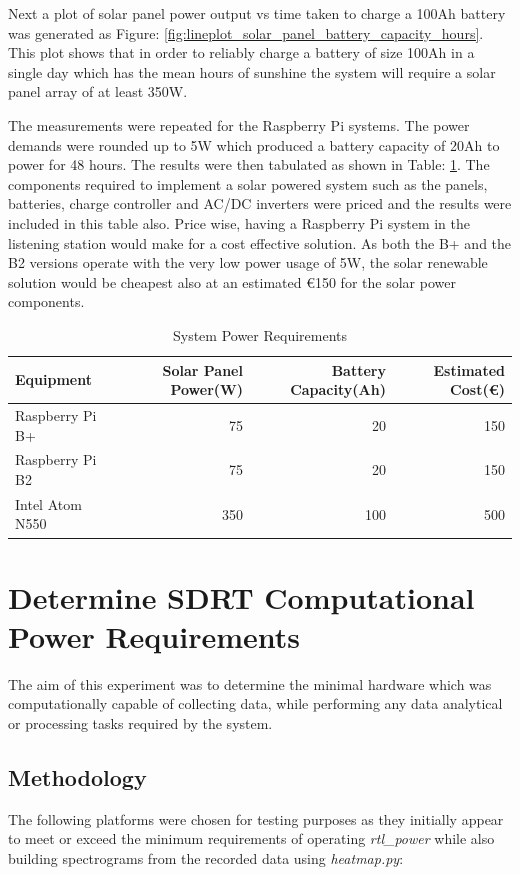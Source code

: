 \documentclass[runningheads,a4paper]{llncs}
\begin{document}
Next a plot of solar panel power output vs time taken to charge a 100Ah battery was generated as Figure: \ref{fig:lineplot_solar_panel_battery_capacity_hours}. This plot shows that in order to reliably charge a battery of size 100Ah in a single day which has the mean hours of sunshine the system will require a solar panel array of at least 350W.

The measurements were repeated for the Raspberry Pi systems. The power demands were rounded up to 5W which produced a battery capacity of 20Ah to power for 48 hours. The results were then tabulated as shown in Table: \ref{tab:system_power_requirements}. The components required to implement a solar powered system such as the panels, batteries, charge controller and AC/DC inverters were priced and the results were included in this table also. Price wise, having a Raspberry Pi system in the listening station would make for a cost effective solution. As both the B+ and the B2 versions operate with the very low power usage of 5W, the solar renewable solution would be cheapest also at an estimated \euro 150 for the solar power components.

%
\begin{table}
	\centering
	\begin{tabular}{l r r r}
		\toprule
		Equipment & Solar Panel Power(W) & Battery Capacity(Ah) & Estimated Cost(\euro)\\ \midrule
		Raspberry Pi B+ & 75 & 20 & 150 \\
		Raspberry Pi B2 & 75 & 20 & 150 \\
		Intel Atom N550 & 350 & 100 & 500 \\
		\bottomrule
	\end{tabular}
	\caption{System Power Requirements}
	\label{tab:system_power_requirements}
\end{table}
%


\section*{Determine SDRT Computational Power Requirements}
The aim of this experiment was to determine the minimal hardware which was computationally capable of collecting data, while  performing any data analytical or processing tasks required by the system.

\subsection*{Methodology}
The following platforms were chosen for testing purposes as they initially appear to meet or exceed the minimum requirements of operating \textit{rtl\_power} while also building spectrograms from the recorded data using \textit{heatmap.py}:
\end{document}
